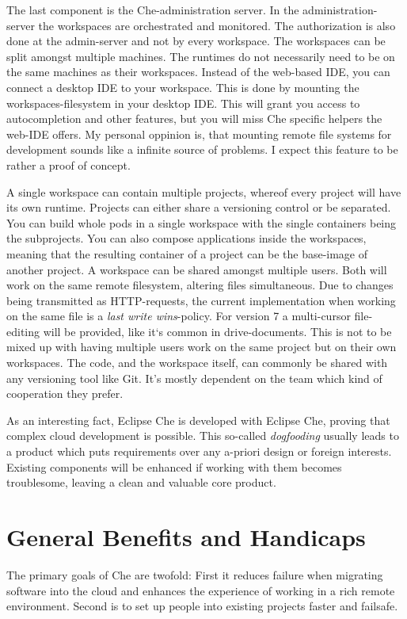 \documentclass[utf8]{lni}
\begin{document}
The last component is the Che-administration server. 
In the administration-server the workspaces are orchestrated and monitored. 
The authorization is also done at the admin-server and not by every workspace.
The workspaces can be split amongst multiple machines.
The runtimes do not necessarily need to be on the same machines as their workspaces. 
Instead of the web-based IDE, you can connect a desktop IDE to your workspace. 
This is done by mounting the workspaces-filesystem  in  your  desktop  IDE. 
This  will grant you access to autocompletion and other features, but you will miss Che specific helpers the web-IDE offers. 
My personal oppinion is, that mounting remote file systems for development sounds like a infinite source of problems. 
I expect this feature to be rather a proof of concept.

A single workspace can contain multiple projects, whereof every project will have its own runtime. 
Projects can either share a versioning control or be separated. 
You can build whole pods in a single workspace with the single containers being the subprojects. 
You can also compose applications inside the workspaces, meaning that the resulting 
container of a project can be the base-image of another project. 
A workspace can be shared amongst multiple users. 
Both will work on the same remote filesystem, altering files simultaneous. 
Due to changes being transmitted as HTTP-requests, the current implementation when working on the same file is a \textit{last write wins}-policy. 
For version 7 a multi-cursor file-editing will be provided, like it`s common in 
drive-documents. 
This is not to be mixed up with having multiple users work on the same project but on their own workspaces. 
The code, and the workspace itself, can commonly be shared with any versioning tool like Git.
It's mostly dependent on the team which kind of cooperation they prefer. 

As  an  interesting  fact,  Eclipse  Che  is  developed  with Eclipse Che, proving that complex cloud development is possible. 
This so-called \textit{dogfooding} usually leads to a product which puts requirements over any a-priori design or foreign interests.  
Existing components will be enhanced if working with them becomes troublesome, leaving a clean and valuable core product. 

\section{General Benefits and Handicaps}
\label{sec:Eval}
The primary goals of Che are twofold: 
First it reduces failure when migrating software into the cloud and enhances the experience of working in a rich remote environment.
Second is to set up people into existing projects faster and failsafe.
\end{document}
